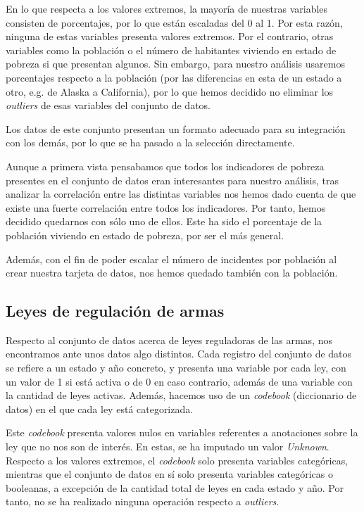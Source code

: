 \documentclass[11pt,a4paper]{article}
\begin{document}
En lo que respecta a los valores extremos, la mayoría de nuestras variables consisten de porcentajes, por lo que están escaladas del 0 al 1. Por esta razón, ninguna de estas variables presenta valores extremos. Por el contrario, otras variables como la población o el número de habitantes viviendo en estado de pobreza si que presentan algunos. Sin embargo, para nuestro análisis usaremos porcentajes respecto a la población (por las diferencias en esta de un estado a otro, e.g. de Alaska a California), por lo que hemos decidido no eliminar los \textit{outliers} de esas variables del conjunto de datos.

Los datos de este conjunto presentan un formato adecuado para su integración con los demás, por lo que se ha pasado a la selección directamente.

Aunque a primera vista pensabamos que todos los indicadores de pobreza presentes en el conjunto de datos eran interesantes para nuestro análisis, tras analizar la correlación entre las distintas variables nos hemos dado cuenta de que existe una fuerte correlación entre todos los indicadores. Por tanto, hemos decidido quedarnos con sólo uno de ellos. Este ha sido el porcentaje de la población viviendo en estado de pobreza, por ser el más general.

Además, con el fin de poder escalar el número de incidentes por población al crear nuestra tarjeta de datos, nos hemos quedado también con la población.

\subsection{Leyes de regulación de armas}

Respecto al conjunto de datos acerca de leyes reguladoras de las armas, nos encontramos ante unos datos algo distintos. Cada registro del conjunto de datos se refiere a un estado y año concreto, y presenta una variable por cada ley, con un valor de 1 si está activa o de 0 en caso contrario, además de una variable con la cantidad de leyes activas. Además, hacemos uso de un \textit{codebook} (diccionario de datos) en el que cada ley está categorizada.

Este \textit{codebook} presenta valores nulos en variables referentes a anotaciones sobre la ley que no nos son de interés. En estas, se ha imputado un valor \textit{Unknown}. Respecto a los valores extremos, el \textit{codebook} solo presenta variables categóricas, mientras que el conjunto de datos en sí solo presenta variables categóricas o booleanas, a excepción de la cantidad total de leyes en cada estado y año. Por tanto, no se ha realizado ninguna operación respecto a \textit{outliers}.
\end{document}
